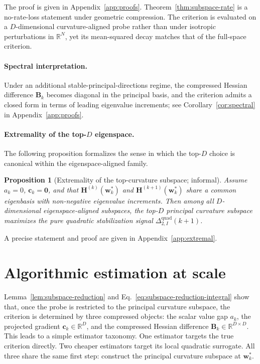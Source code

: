 \documentclass{article}
\newtheorem{proposition}[theorem]{Proposition}
\begin{document}
The proof is given in Appendix~\ref{app:proofs}. Theorem~\ref{thm:subspace-rate} is a no-rate-loss statement under geometric compression. The criterion is evaluated on a $D$-dimensional curvature-aligned probe rather than under isotropic perturbations in $\mathbb R^N$, yet its mean-squared decay matches that of the full-space criterion.

\paragraph{Spectral interpretation.}
Under an additional stable-principal-directions regime, the compressed Hessian difference $\mathbf B_k$ becomes diagonal in the principal basis, and the criterion admits a closed form in terms of leading eigenvalue increments; see Corollary~\ref{cor:spectral} in Appendix~\ref{app:proofs}.

\paragraph{Extremality of the top-$D$ eigenspace.}
The following proposition formalizes the sense in which the top-$D$ choice is canonical within the eigenspace-aligned family.

\begin{proposition}[Extremality of the top-curvature subspace; informal]
\label{prop:extremal-topD}
Assume $a_k=0$, $\mathbf c_k=\mathbf 0$, and that $\mathbf H^{(k)}(\mathbf w_k^*)$ and $\mathbf H^{(k+1)}(\mathbf w_k^*)$ share a common eigenbasis with non-negative eigenvalue increments. Then among all $D$-dimensional eigenspace-aligned subspaces, the top-$D$ principal curvature subspace maximizes the pure quadratic stabilization signal $\Delta_{2,I}^{\mathrm{quad}}(k+1)$.
\end{proposition}

A precise statement and proof are given in Appendix~\ref{app:extremal}.

\section{Algorithmic estimation at scale}
\label{sec:algo}

Lemma~\ref{lem:subspace-reduction} and Eq.~\eqref{eq:subspace-reduction-integral} show that, once the probe is restricted to the principal curvature subspace, the criterion is determined by three compressed objects: the scalar value gap $a_k$, the projected gradient $\mathbf c_k\in\mathbb R^D$, and the compressed Hessian difference $\mathbf B_k\in\mathbb R^{D\times D}$.
This leads to a simple estimator taxonomy.
One estimator targets the true criterion directly.
Two cheaper estimators target its local quadratic surrogate.
All three share the same first step: construct the principal curvature subspace at $\mathbf w_k^*$.
\end{document}
